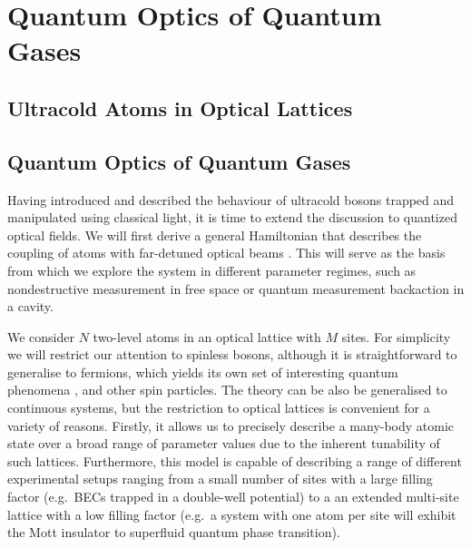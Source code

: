 
\chapter{Quantum Optics of Quantum Gases}  

\ifpdf
    \graphicspath{{Chapter2/Figs/Raster/}{Chapter2/Figs/PDF/}{Chapter2/Figs/}}
\else
    \graphicspath{{Chapter2/Figs/Vector/}{Chapter2/Figs/}}
\fi



\section{Ultracold Atoms in Optical Lattices}


\section{Quantum Optics of Quantum Gases}

Having introduced and described the behaviour of ultracold bosons
trapped and manipulated using classical light, it is time to extend
the discussion to quantized optical fields. We will first derive a
general Hamiltonian that describes the coupling of atoms with
far-detuned optical beams \cite{mekhov2012}. This will serve as the
basis from which we explore the system in different parameter regimes,
such as nondestructive measurement in free space or quantum
measurement backaction in a cavity.

We consider $N$ two-level atoms in an optical lattice with $M$
sites. For simplicity we will restrict our attention to spinless
bosons, although it is straightforward to generalise to fermions,
which yields its own set of interesting quantum phenomena
\cite{atoms2015, mazzucchi2016, mazzucchi2016af}, and other spin
particles. The theory can be also be generalised to continuous
systems, but the restriction to optical lattices is convenient for a
variety of reasons. Firstly, it allows us to precisely describe a
many-body atomic state over a broad range of parameter values due to
the inherent tunability of such lattices. Furthermore, this model is
capable of describing a range of different experimental setups ranging
from a small number of sites with a large filling factor (e.g.~BECs
trapped in a double-well potential) to a an extended multi-site
lattice with a low filling factor (e.g.~a system with one atom per
site will exhibit the Mott insulator to superfluid quantum phase
transition). 

